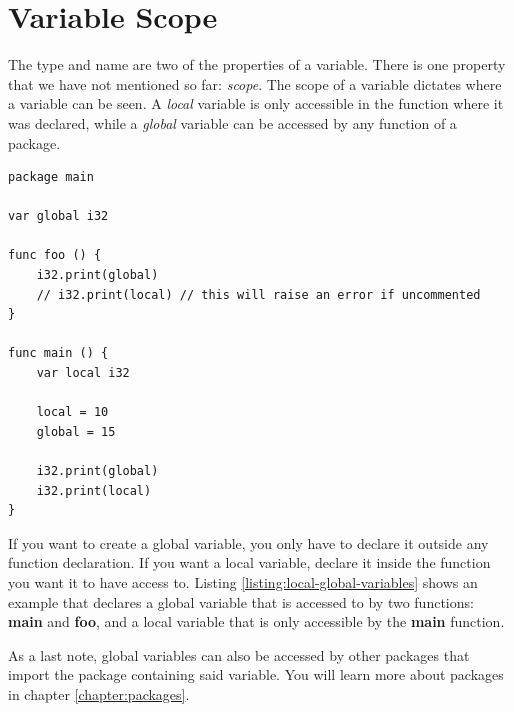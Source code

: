 \documentclass[11pt,fleqn,openany]{book} %
\begin{document}
\section{Variable Scope}


The type and name are two of the properties of a variable. There is one property that we have not mentioned so far: \emph{scope}. The scope of a variable dictates where a variable can be seen. A \emph{local} variable is only accessible in the function where it was declared, while a \emph{global} variable can be accessed by any function of a package.

\begin{lstlisting}[caption={Local and global variables},captionpos=b,label={listing:local-global-variables}]
package main

var global i32

func foo () {
    i32.print(global)
    // i32.print(local) // this will raise an error if uncommented
}

func main () {
    var local i32
    
    local = 10
    global = 15
    
    i32.print(global)
    i32.print(local)
}
\end{lstlisting}

If you want to create a global variable, you only have to declare it outside any function declaration. If you want a local variable, declare it inside the function you want it to have access to. Listing \ref{listing:local-global-variables} shows an example that declares a global variable that is accessed to by two functions: \textbf{main} and \textbf{foo}, and a local variable that is only accessible by the \textbf{main} function.

As a last note, global variables can also be accessed by other packages that import the package containing said variable. You will learn more about packages in chapter \ref{chapter:packages}.
\end{document}
